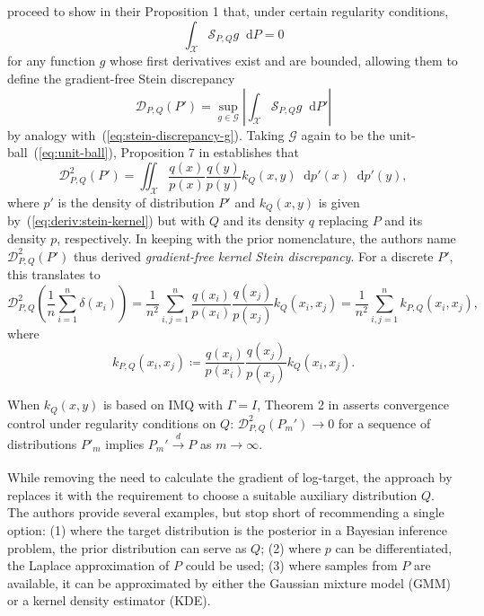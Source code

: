 \documentclass[11pt,a4paper]{report}
\newcommand*\diff{\mathop{}\!\mathrm{d}}
\begin{document}
\cite{fisherGradientFreeKernelStein2024} proceed to show in their Proposition 1 that, under certain regularity conditions,
\begin{equation*}
\int_\mathcal{X} \mathcal{S}_{P,Q} g \diff P = 0
\end{equation*}
for any function $g$ whose first derivatives exist and are bounded, allowing them to define the gradient-free Stein discrepancy
\begin{equation*}
\mathcal{D}_{P, Q}(P') = \sup_{g \in \mathcal{G}}\left|\int_\mathcal{X} \mathcal{S}_{P,Q} g \diff P' \right|
\end{equation*}
by analogy with~(\ref{eq:stein-discrepancy-g}). Taking $\mathcal{G}$ again to be the unit-ball~(\ref{eq:unit-ball}), Proposition 7 in \cite{fisherGradientFreeKernelStein2024} establishes that
\begin{equation}
\mathcal{D}_{P, Q}^2(P') = \iint_\mathcal{X} \frac{q(x)}{p(x)} \frac{q(y)}{p(y)} k_Q(x, y) \diff p'(x) \diff p'(y),
\label{eq:gf-ksd:int}
\end{equation}
where $p'$ is the density of distribution $P'$ and $k_Q(x, y)$ is given by~(\ref{eq:deriv:stein-kernel}) but with $Q$ and its density $q$ replacing $P$ and its density $p$, respectively. 
In keeping with the prior nomenclature, the authors name $\mathcal{D}_{P, Q}^2(P')$ thus derived \textit{gradient-free kernel Stein discrepancy}.
For a discrete $P'$, this translates to
\begin{equation}
\mathcal{D}_{P, Q}^2\left(\frac{1}{n} \sum_{i=1}^n \delta(x_i)\right) 
= \frac{1}{n^2} \sum_{i,j=1}^n \frac{q(x_i)}{p(x_i)} \frac{q(x_j)}{p(x_j)} k_Q(x_i, x_j)
= \frac{1}{n^2} \sum_{i,j=1}^n k_{P,Q}(x_i, x_j),
\label{eq:gf-ksd:discrete}
\end{equation}
where
\begin{equation}
k_{P,Q}(x_i, x_j) \coloneq \frac{q(x_i)}{p(x_i)} \frac{q(x_j)}{p(x_j)} k_Q(x_i, x_j).
\label{eq:k_P_Q}
\end{equation}

When $k_Q(x,y)$ is based on IMQ with $\Gamma = I$, Theorem 2 in \cite{fisherGradientFreeKernelStein2024} asserts convergence control under regularity conditions on $Q$: $\mathcal{D}_{P, Q}^2(P_m') \to 0$ for a sequence of distributions $P'_m$ implies $P_m' \xrightarrow[]{d} P$ as $m \to \infty$. 

While removing the need to calculate the gradient of log-target, the approach by \cite{fisherGradientFreeKernelStein2024} replaces it with the requirement to choose a suitable auxiliary distribution $Q$. The authors provide several examples, but stop short of recommending a single option: (1) where the target distribution is the posterior in a Bayesian inference problem, the prior distribution can serve as $Q$; (2) where $p$ can be differentiated, the Laplace approximation of $P$ could be used; (3) where samples from $P$ are available, it can be approximated by either the Gaussian mixture model (GMM) or a kernel density estimator (KDE).
\end{document}
